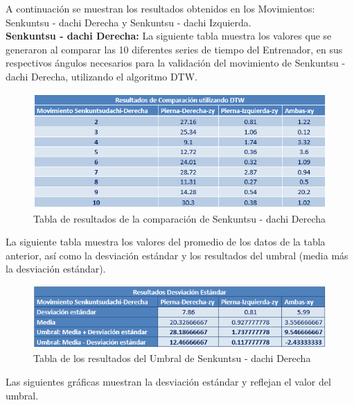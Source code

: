 A continuación se muestran los resultados obtenidos en los Movimientos: Senkuntsu - dachi Derecha y Senkuntsu - dachi Izquierda.\\

\textbf{Senkuntsu - dachi Derecha:}
La siguiente tabla muestra los valores que se generaron al comparar las 10 diferentes series de tiempo del Entrenador, en sus respectivos ángulos necesarios para la validación del movimiento de Senkuntsu - dachi Derecha, utilizando el algoritmo DTW.
\begin{figure}[H]%
	\begin{center}
		\includegraphics[scale=1]{./Figuras/Implementacion/Senkuntsudachi_Derecha_TablaDTW}
	\end{center}
	\caption{Tabla de resultados de la comparación de Senkuntsu - dachi Derecha}
	\label{fig:Senkuntsudachi_Derecha_TablaDTW}
\end{figure}
La siguiente tabla muestra los valores del promedio de los datos de la tabla anterior, así como la desviación estándar y los resultados del umbral (media más la desviación estándar).
\begin{figure}[H]%
	\begin{center}
		\includegraphics[scale=1]{./Figuras/Implementacion/Senkuntsudachi_Derecha_TablaDesvEstandar}
	\end{center}
	\caption{Tabla de los resultados del Umbral de Senkuntsu - dachi Derecha}
	\label{fig:Senkuntsudachi_Derecha_TablaDesvEstandar}
\end{figure}
Las siguientes gráficas muestran la desviación estándar y reflejan el valor del umbral.
